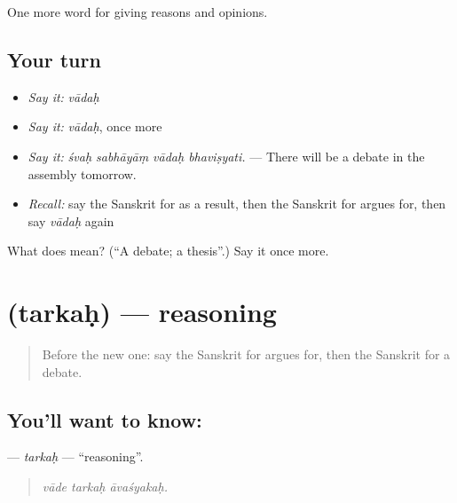 \begin{grammarlens}[title={What you've built}]
One more word for giving reasons and opinions.
\end{grammarlens}

\subsection*{Your turn}
\begin{itemize}
\raggedright
  \item \emph{Say it:} \emph{vādaḥ}
  \item \emph{Say it:} \emph{vādaḥ}, once more
  \item \emph{Say it:} \emph{śvaḥ sabhāyāṃ vādaḥ bhaviṣyati.} — There will be a debate in the assembly tomorrow.
  \item \emph{Recall:} say the Sanskrit for as a result, then the Sanskrit for argues for, then say \emph{vādaḥ} again
\end{itemize}

\begin{tcolorbox}[breakable,colback=teal!4,colframe=teal!35!black,title={Before you move on}]
What does  mean? (\textquotedblleft{}A debate; a thesis\textquotedblright{}.) Say it once more.
\end{tcolorbox}
\section[\texorpdfstring{\sk{तर्कः} (tarkaḥ)}{तर्कः (tarkaḥ)}]{ (tarkaḥ) — reasoning}

\label{lesson:SA-C343-tarkah}



\begin{quote}
Before the new one: say the Sanskrit for argues for, then the Sanskrit for a debate.
\end{quote}

\subsection*{You'll want to know: }
\textbf{} — \emph{tarkaḥ} — \textquotedblleft{}reasoning\textquotedblright{}.

\begin{quote}
  
\end{quote}

\begin{quote}
\emph{vāde tarkaḥ āvaśyakaḥ.}
\end{quote}

